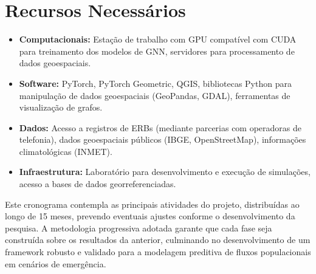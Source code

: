 \section{Recursos Necessários}

\begin{itemize}[noitemsep]
    \item \textbf{Computacionais:} Estação de trabalho com GPU compatível com CUDA para treinamento dos modelos de \gls{GNN}, servidores para processamento de dados geoespaciais.
    
    \item \textbf{Software:} PyTorch, PyTorch Geometric, QGIS, bibliotecas Python para manipulação de dados geoespaciais (GeoPandas, GDAL), ferramentas de visualização de grafos.
    
    \item \textbf{Dados:} Acesso a registros de \gls{ERB}s (mediante parcerias com operadoras de telefonia), dados geoespaciais públicos (IBGE, OpenStreetMap), informações climatológicas (INMET).
    
    \item \textbf{Infraestrutura:} Laboratório para desenvolvimento e execução de simulações, acesso a bases de dados georreferenciadas.
\end{itemize}

\noindent Este cronograma contempla as principais atividades do projeto, distribuídas ao longo de 15 meses, prevendo eventuais ajustes conforme o desenvolvimento da pesquisa. A metodologia progressiva adotada garante que cada fase seja construída sobre os resultados da anterior, culminando no desenvolvimento de um framework robusto e validado para a modelagem preditiva de fluxos populacionais em cenários de emergência.